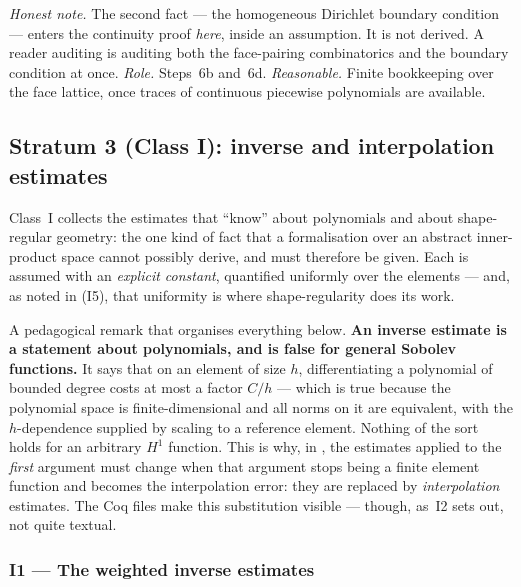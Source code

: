 \documentclass[11pt]{article}
\newcommand{\coq}[1]{\texttt{\detokenize{#1}}}
\newcommand{\lbl}[1]{\texttt{\detokenize{#1}}}
\begin{document}
\emph{Honest note.} The second fact --- the homogeneous Dirichlet boundary
condition --- enters the continuity proof \emph{here}, inside an assumption. It
is not derived. A reader auditing \coq{H_assemble_p} is auditing both the
face-pairing combinatorics and the boundary condition at once.
\emph{Role.} Steps~6b and~6d. \emph{Reasonable.} Finite bookkeeping over the
face lattice, once traces of continuous piecewise polynomials are available.

\subsection{Stratum 3 (Class I): inverse and interpolation estimates}\label{sec:stratumI}

Class~I collects the estimates that ``know'' about polynomials and about
shape-regular geometry: the one kind of fact that a formalisation over an
abstract inner-product space cannot possibly derive, and must therefore be
given. Each is assumed with an \emph{explicit constant}, quantified uniformly
over the elements --- and, as noted in (I5), that uniformity is where
shape-regularity does its work.

A pedagogical remark that organises everything below. \textbf{An inverse
estimate is a statement about polynomials, and is false for general Sobolev
functions.} It says that on an element of size $h$, differentiating a
polynomial of bounded degree costs at most a factor $C/h$ --- which is true
because the polynomial space is finite-dimensional and all norms on it are
equivalent, with the $h$-dependence supplied by scaling to a reference element.
Nothing of the sort holds for an arbitrary $H^1$ function. This is why, in
\lbl{lem:continterp}, the estimates applied to the \emph{first} argument must
change when that argument stops being a finite element function and becomes the
interpolation error: they are replaced by \emph{interpolation} estimates. The
Coq files make this substitution visible --- though, as~I2 sets out, not quite
textual.

\subsubsection{I1 --- The weighted inverse estimates}
\end{document}
